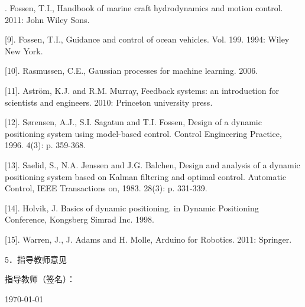 \documentclass[a4paper]{ctexart}
\begin{document}
 \begin{mdframed}
 {\large \fangsong
 [8].	Fossen, T.I., Handbook of marine craft hydrodynamics and motion control. 2011: John Wiley  Sons.
 
 [9].	Fossen, T.I., Guidance and control of ocean vehicles. Vol. 199. 1994: Wiley New York.
 
[10].	Rasmussen, C.E., Gaussian processes for machine learning. 2006.

[11].	Aström, K.J. and R.M. Murray, Feedback systems: an introduction for scientists and engineers. 2010: Princeton university press.

[12].	Sørensen, A.J., S.I. Sagatun and T.I. Fossen, Design of a dynamic positioning system using model-based control. Control Engineering Practice, 1996. 4(3): p. 359-368.

[13].	Saelid, S., N.A. Jenssen and J.G. Balchen, Design and analysis of a dynamic positioning system based on Kalman filtering and optimal control. Automatic Control, IEEE Transactions on, 1983. 28(3): p. 331-339.

[14].	Holvik, J. Basics of dynamic positioning. in Dynamic Positioning Conference, Kongsberg Simrad Inc. 1998.

[15].	Warren, J., J. Adams and H. Molle, Arduino for Robotics. 2011: Springer.

\begin{flushleft}
5．指导教师意见

\end{flushleft}
\vskip7.8cm
\begin{flushright}
指导教师（签名）：\quad \quad \quad 

\today
\end{flushright}                  
}
\end{mdframed}

\end{document}
